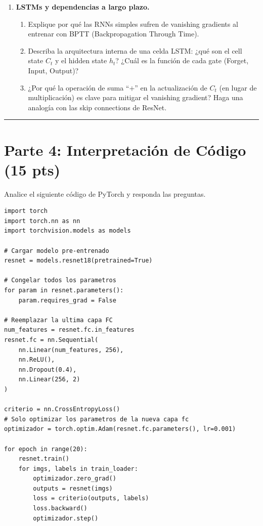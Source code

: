 \documentclass[12pt,a4paper]{article}
\begin{document}
\begin{enumerate}[label=\arabic*)]
    \item \textbf{LSTMs y dependencias a largo plazo.} \\
    \begin{enumerate}[label=\alph*)]
        \item Explique por qué las RNNs simples sufren de vanishing gradients al entrenar con BPTT (Backpropagation Through Time).
        \item Describa la arquitectura interna de una celda LSTM: ¿qué son el cell state $C_t$ y el hidden state $h_t$? ¿Cuál es la función de cada gate (Forget, Input, Output)?
        \item ¿Por qué la operación de suma ``$+$'' en la actualización de $C_t$ (en lugar de multiplicación) es clave para mitigar el vanishing gradient? Haga una analogía con las skip connections de ResNet.
    \end{enumerate}
\end{enumerate}

\vspace{0.5cm}
\hrule
\vspace{0.5cm}

\section*{Parte 4: Interpretación de Código (15 pts)}

Analice el siguiente código de PyTorch y responda las preguntas.

\begin{lstlisting}
import torch
import torch.nn as nn
import torchvision.models as models

# Cargar modelo pre-entrenado
resnet = models.resnet18(pretrained=True)

# Congelar todos los parametros
for param in resnet.parameters():
    param.requires_grad = False

# Reemplazar la ultima capa FC
num_features = resnet.fc.in_features
resnet.fc = nn.Sequential(
    nn.Linear(num_features, 256),
    nn.ReLU(),
    nn.Dropout(0.4),
    nn.Linear(256, 2)
)

criterio = nn.CrossEntropyLoss()
# Solo optimizar los parametros de la nueva capa fc
optimizador = torch.optim.Adam(resnet.fc.parameters(), lr=0.001)

for epoch in range(20):
    resnet.train()
    for imgs, labels in train_loader:
        optimizador.zero_grad()
        outputs = resnet(imgs)
        loss = criterio(outputs, labels)
        loss.backward()
        optimizador.step()
\end{lstlisting}
\end{document}
